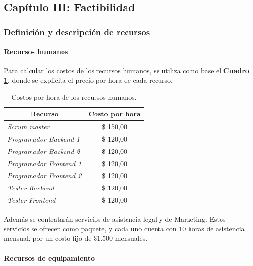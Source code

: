\subsection{Capítulo III: Factibilidad}
\subsubsection{Definición y descripción de recursos}


\paragraph{Recursos humanos}

Para calcular los costos de los recursos humanos, se utiliza como base el \textbf{Cuadro \ref{costosRRHH}}, donde se explicita el precio por hora de cada recurso. 

\begin{table}[h]
\centering
\begin{tabular}{|l|c|}
\hline
\multicolumn{1}{|c|}{{\bf Recurso}} & {\bf Costo por hora} \\ \hline
{\it Scrum master}                  & \$ 150,00            \\ \hline
{\it Programador Backend 1}         & \$ 120,00            \\ \hline
{\it Programador Backend 2}         & \$ 120,00            \\ \hline
{\it Programador Frontend 1}        & \$ 120,00            \\ \hline
{\it Programador Frontend 2}        & \$ 120,00            \\ \hline
{\it Tester Backend}                & \$ 120,00            \\ \hline
{\it Tester Frontend}               & \$ 120,00            \\ \hline
\end{tabular}
\caption{Costos por hora de los recursos humanos.}
\label{costosRRHH}
\end{table}

Además se contratarán servicios de asistencia legal y de Marketing.
Estos servicios se ofrecen como paquete, y cada uno cuenta con 10 horas de asistencia mensual, por un costo fijo de \$1.500 mensuales.

\paragraph{Recursos de equipamiento}

